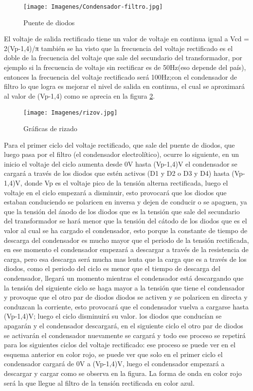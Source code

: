 \documentclass{article}
\begin{document}
\begin{figure}[h!]
    \centering
    \texttt{[image: Imagenes/Condensador-filtro.jpg]}
    \caption{Puente de diodos}
    \label{fig:puentDiod1}
\end{figure}

El voltaje de salida rectificado tiene un valor de voltaje en continua igual a Vcd = 2(Vp-1,4)/π también se ha visto que la frecuencia del voltaje rectificado es el doble de la frecuencia del voltaje que sale del secundario del transformador, por ejemplo si la frecuencia de voltaje sin rectificar es de 50Hz(eso depende del país), entonces la frecuencia del voltaje rectificado será 100Hz;con el condensador de filtro lo que logra es mejorar el nivel de salida en continua, el cual se aproximará  al valor de (Vp-1,4) como se aprecia en la figura \ref{fig:rizado}.\\

\begin{figure}[h!]
    \centering
    \texttt{[image: Imagenes/rizov.jpg]}
    \caption{Gráficas de rizado}
    \label{fig:rizado}
\end{figure}

 Para el primer ciclo del voltaje rectificado, que sale  del puente de diodos, que luego pasa por el filtro (el condensador electrolítico), ocurre lo siguiente, en un inicio el voltaje del ciclo aumenta desde 0V hasta (Vp-1,4)V  el condensador se cargará a través de los diodos que estén activos (D1 y D2 o D3 y D4) hasta (Vp-1,4)V, donde Vp es el voltaje pico de la tensión alterna rectificada, luego el voltaje en el ciclo empezará a disminuir, esto provocará que los diodos que estaban conduciendo se polaricen en inversa y dejen de conducir o se apaguen, ya que la tensión del ánodo de los diodos que es la tensión que sale del secundario del transformador se hará menor que la tensión del cátodo de los diodos que es el valor al cual se ha cargado el condensador, esto porque la constante de tiempo de descarga del condensador es mucho mayor que el periodo de la tensión rectificada, en ese momento el condensador empezará a descargar a través de la resistencia de carga, pero esa descarga será mucha mas lenta que la carga que es a través de los diodos, como el periodo del ciclo es menor que el tiempo de descarga del condensador, llegará un momento mientras el condensador está descargando que la tensión del siguiente ciclo se haga mayor a la tensión que tiene el condensador y provoque que el otro par de diodos diodos se activen y se polaricen en directa y conduzcan la corriente, esto provocará que el condensador vuelva a cargarse hasta (Vp-1,4)V; luego el ciclo disminuirá su valor. los diodos que conducían se apagarán y el condensador descargará, en el siguiente ciclo el otro par de diodos se activarán el condensador nuevamente se cargará y todo ese proceso se repetirá para los siguientes ciclos del voltaje rectificado: ese proceso se puede ver en el esquema anterior en color rojo, se puede ver que solo en el primer ciclo el condensador cargará de 0V a (Vp-1,4)V, luego el condensador empezará a descargar y cargar como se observa en la figura. La forma de onda en color rojo será la que llegue al  filtro de la tensión rectificada en color azul.\citep{FiltroParaCorrienteAlterna}\\
\end{document}
